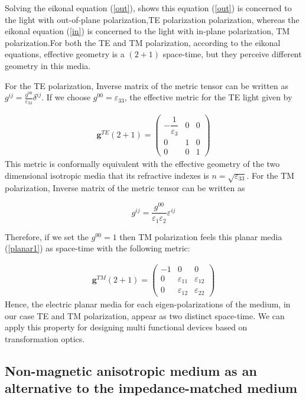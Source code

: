 \documentclass[9pt,twocolumn,twoside]{osajnl}
\begin{document}
Solving the eikonal equation (\ref{out}),  shows this equation (\ref{out}) is concerned to the light with out-of-plane polarization,TE polarization polarization, whereas the eikonal equation (\ref{in}) is concerned to the light with in-plane polarization, TM polarization.For both the TE and TM polarization, according to the eikonal equations, effective geometry is a $(2+1)$ space-time, but they perceive different geometry in this media.

For the TE polarization, Inverse matrix of the metric tensor can be written as $g^{ij}=\frac{g^{00}}{\varepsilon_{33}}\delta^{ij}$. If we choose $g^{00}=\varepsilon_{33}$, the effective metric for the TE light given by

\begin{align}\label{metric-te}
\mathbf{g}^{TE}(2+1)=
\begin{pmatrix}
-\dfrac{1}{\varepsilon_{3}}&0&0\\
0&1& 0\\
0&0&1
\end{pmatrix}
\end{align}
This metric is conformally equivalent with the effective geometry of the two dimensional isotropic media that its refractive indexes is $n=\sqrt{\varepsilon_{33}}$. 
For the TM polarization, Inverse matrix of the metric tensor can be written as

 \begin{equation}
g^{ij}=\dfrac{g^{00}}{\varepsilon_{1}\varepsilon_{2}}\varepsilon^{ij}
\end{equation}

Therefore, if we set the $g^{00}=1$ then TM polarization feels this planar media (\ref{planar1}) as space-time with the following metric: 

\begin{align}\label{metric-tm}
\mathbf{g}^{TM}(2+1)=
\begin{pmatrix}
-1&0&0\\
0&\varepsilon_{11}& \varepsilon_{12}\\
0&\varepsilon_{12}&\varepsilon_{22}
\end{pmatrix} 
\end{align}
Hence, the electric planar media  for each  eigen-polarizations of the medium, in our case TE and TM polarization, appear as two distinct space-time. We can apply this property for designing multi functional devices based on transformation optics.

\subsection{Non-magnetic anisotropic medium as an alternative to the impedance-matched medium } 
\end{document}
